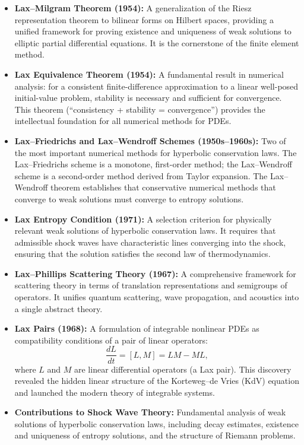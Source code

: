 \begin{itemize}
    \item \textbf{Lax--Milgram Theorem (1954):} A generalization of the Riesz representation theorem to bilinear forms on Hilbert spaces, providing a unified framework for proving existence and uniqueness of weak solutions to elliptic partial differential equations. It is the cornerstone of the finite element method.
    \item \textbf{Lax Equivalence Theorem (1954):} A fundamental result in numerical analysis: for a consistent finite-difference approximation to a linear well-posed initial-value problem, stability is necessary and sufficient for convergence. This theorem (``consistency + stability = convergence'') provides the intellectual foundation for all numerical methods for PDEs.
    \item \textbf{Lax--Friedrichs and Lax--Wendroff Schemes (1950s--1960s):} Two of the most important numerical methods for hyperbolic conservation laws. The Lax--Friedrichs scheme is a monotone, first-order method; the Lax--Wendroff scheme is a second-order method derived from Taylor expansion. The Lax--Wendroff theorem establishes that conservative numerical methods that converge to weak solutions must converge to entropy solutions.
    \item \textbf{Lax Entropy Condition (1971):} A selection criterion for physically relevant weak solutions of hyperbolic conservation laws. It requires that admissible shock waves have characteristic lines converging into the shock, ensuring that the solution satisfies the second law of thermodynamics.
    \item \textbf{Lax--Phillips Scattering Theory (1967):} A comprehensive framework for scattering theory in terms of translation representations and semigroups of operators. It unifies quantum scattering, wave propagation, and acoustics into a single abstract theory.
    \item \textbf{Lax Pairs (1968):} A formulation of integrable nonlinear PDEs as compatibility conditions of a pair of linear operators:
    \[
    \frac{dL}{dt} = [L, M] = LM - ML,
    \]
    where \(L\) and \(M\) are linear differential operators (a Lax pair). This discovery revealed the hidden linear structure of the Korteweg--de Vries (KdV) equation and launched the modern theory of integrable systems.
    \item \textbf{Contributions to Shock Wave Theory:} Fundamental analysis of weak solutions of hyperbolic conservation laws, including decay estimates, existence and uniqueness of entropy solutions, and the structure of Riemann problems.
\end{itemize}


